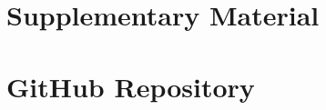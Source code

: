 
\begin{appendices}


\chapter{Supplementary Material}





\chapter{GitHub Repository}




\end{appendices}